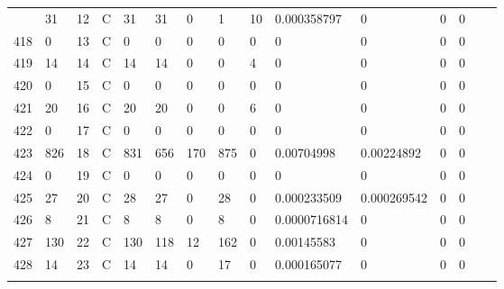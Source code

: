 \begin{longtable}{lllllllllllllll}
\begin{comment}
	417 & 31                & 12  & C   & 31                & 31                & 0                 & 1    & 10         & 0.000358797    & 0              & 0             & 0            \\
	418 & 0                 & 13  & C   & 0                 & 0                 & 0                 & 0    & 0          & 0              & 0              & 0             & 0            \\
	419 & 14                & 14  & C   & 14                & 14                & 0                 & 0    & 4          & 0              & 0              & 0             & 0            \\
	420 & 0                 & 15  & C   & 0                 & 0                 & 0                 & 0    & 0          & 0              & 0              & 0             & 0            \\
	421 & 20                & 16  & C   & 20                & 20                & 0                 & 0    & 6          & 0              & 0              & 0             & 0            \\
	422 & 0                 & 17  & C   & 0                 & 0                 & 0                 & 0    & 0          & 0              & 0              & 0             & 0            \\
	423 & 826               & 18  & C   & 831               & 656               & 170               & 875  & 0          & 0.00704998     & 0.00224892     & 0             & 0            \\
	424 & 0                 & 19  & C   & 0                 & 0                 & 0                 & 0    & 0          & 0              & 0              & 0             & 0            \\
	425 & 27                & 20  & C   & 28                & 27                & 0                 & 28   & 0          & 0.000233509    & 0.000269542    & 0             & 0            \\
	426 & 8                 & 21  & C   & 8                 & 8                 & 0                 & 8    & 0          & 0.0000716814   & 0              & 0             & 0            \\
	427 & 130               & 22  & C   & 130               & 118               & 12                & 162  & 0          & 0.00145583     & 0              & 0             & 0            \\
	428 & 14                & 23  & C   & 14                & 14                & 0                 & 17   & 0          & 0.000165077    & 0              & 0             & 0            \\

\end{comment}
\end{longtable}
